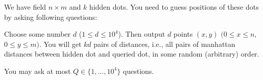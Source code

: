 
We have field $n \times m$ and $k$ hidden dots.
You need to guess positions of these dots by asking following questions:


Choose some number $d$ ($1 \leq d \leq 10^4$).
Then output $d$ points $(x, y)$  $(0 \leq x \leq n$, $0 \leq y \leq m)$.
You will get $kd$ pairs of distances, i.e., all pairs of manhattan distances between hidden dot and queried dot, in some random (arbitrary) order.

You may ask at most $Q\in\{1,\ldots,  10^4\}$ questions.
